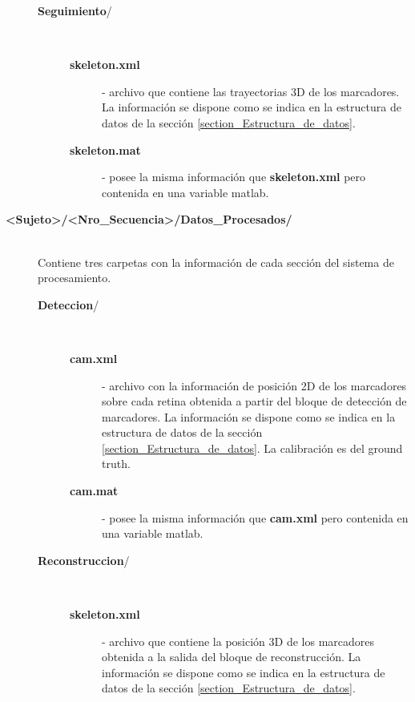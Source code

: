 \begin{description}
\begin{description}
\begin{description}
		\end{description}
	\item[{\small\textbf{\textsf{Seguimiento}}}/] \hfill \\ \vspace{-0.5cm}
		\begin{description}
				\item[{\small\textbf{\textsf{skeleton.xml}}}] - archivo que contiene las trayectorias 3D de los marcadores. La información se dispone como se indica en la estructura de datos de la sección \ref{section_Estructura_de_datos}.   
				\item[{\small\textbf{\textsf{skeleton.mat}}}] -  posee la misma información que {\small\textbf{\textsf{skeleton.xml}}} pero contenida en una variable matlab.
		\end{description}
	\end{description}
\item[{\small\textbf{\textsf{<Sujeto>/<Nro\_Secuencia>/Datos\_Procesados/}}}] \hfill \\
Contiene tres carpetas con la información de cada sección del sistema de procesamiento. \vspace{-0.2cm}
	\begin{description}
	\item[{\small\textbf{\textsf{Deteccion}}}/] \hfill \\\vspace{-0.5cm}
		\begin{description}			
			\item[{\small\textbf{\textsf{cam.xml}}}] - archivo con la información de posición 2D de los marcadores sobre cada retina obtenida a partir del bloque de detección de marcadores. La información se dispone como se indica en la estructura de datos de la sección \ref{section_Estructura_de_datos}. La calibración es del ground truth.  
			\item[{\small\textbf{\textsf{cam.mat}}}] - posee la misma información que {\small\textbf{\textsf{cam.xml}}} pero contenida en una variable matlab.
		\end{description} 			
	\item[{\small\textbf{\textsf{Reconstruccion}}}/] \hfill \\ \vspace{-0.5cm}		
		\begin{description}
			\item[{\small\textbf{\textsf{skeleton.xml}}}] -  archivo que contiene la posición 3D de los marcadores obtenida a la salida del bloque de reconstrucción. La información se dispone como se indica en la estructura de datos de la sección \ref{section_Estructura_de_datos}.

\end{description}
\end{description}
\end{description}
